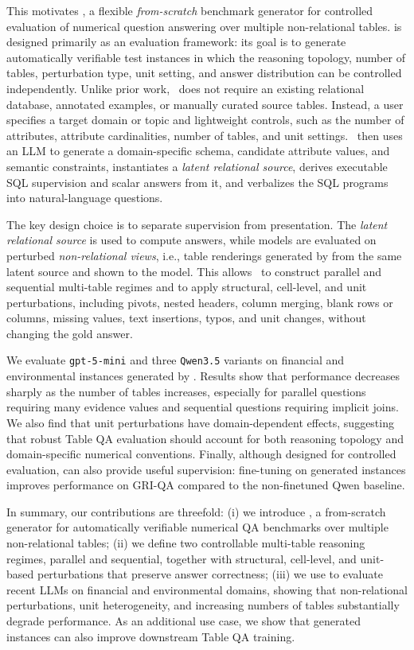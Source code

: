 This motivates \name, a flexible \emph{from-scratch} benchmark generator for controlled evaluation of numerical question answering over multiple non-relational tables. \name is designed primarily as an evaluation framework: its goal is to generate automatically verifiable test instances in which the reasoning topology, number of tables, perturbation type, unit setting, and answer distribution can be controlled independently. Unlike prior work, \name~does not require an existing relational database, annotated examples, or manually curated source tables. Instead, a user specifies a target domain or topic and lightweight controls, such as the number of attributes, attribute cardinalities, number of tables, and unit settings. \name~then uses an LLM to generate a domain-specific schema, candidate attribute values, and semantic constraints, instantiates a \emph{latent relational source}, derives executable SQL supervision and scalar answers from it, and verbalizes the SQL programs into natural-language questions.

The key design choice is to separate supervision from presentation. The \emph{latent relational source} is used to compute answers, while models are evaluated on perturbed \emph{non-relational views}, i.e., table renderings generated by \name from the same latent source and shown to the model. This allows \name~to construct parallel and sequential multi-table regimes and to apply structural, cell-level, and unit perturbations, including pivots, nested headers, column merging, blank rows or columns, missing values, text insertions, typos, and unit changes, without changing the gold answer.

We evaluate \texttt{gpt-5-mini} and three \texttt{Qwen3.5} variants on financial and environmental instances generated by \name. Results show that performance decreases sharply as the number of tables increases, especially for parallel questions requiring many evidence values and sequential questions requiring implicit joins. We also find that unit perturbations have domain-dependent effects, suggesting that robust Table QA evaluation should account for both reasoning topology and domain-specific numerical conventions. Finally, although designed for controlled evaluation, \name can also provide useful supervision: fine-tuning on generated instances improves performance on GRI-QA \cite{1.16} compared to the non-finetuned Qwen baseline.

In summary, our contributions are threefold: 
(i) we introduce \name, a from-scratch generator for automatically verifiable numerical QA benchmarks over multiple non-relational tables; 
(ii) we define two controllable multi-table reasoning regimes, parallel and sequential, together with structural, cell-level, and unit-based perturbations that preserve answer correctness; 
(iii) we use \name to evaluate recent LLMs on financial and environmental domains, showing that non-relational perturbations, unit heterogeneity, and increasing numbers of tables substantially degrade performance. As an additional use case, we show that generated instances can also improve downstream Table QA training.
